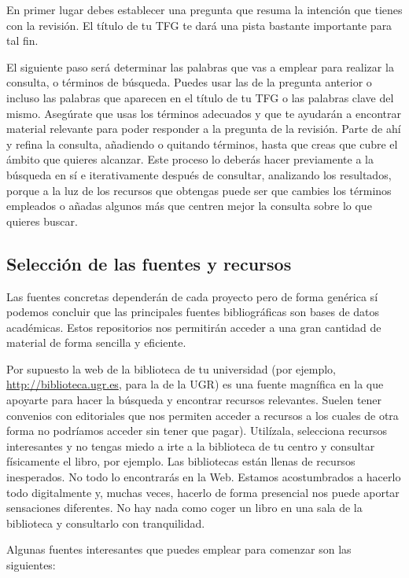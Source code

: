 En primer lugar debes establecer una pregunta que resuma la intención que tienes con la revisión. El título de tu TFG te dará una pista bastante importante para tal fin. 

El siguiente paso será determinar las palabras que vas a emplear para realizar la consulta, o términos de búsqueda. Puedes usar las de la pregunta anterior o incluso las palabras que aparecen en el título de tu TFG o las palabras clave del mismo. Asegúrate que usas los términos adecuados y que te ayudarán a encontrar material relevante para poder responder a la pregunta de la revisión. Parte de ahí y refina la consulta, añadiendo o quitando términos, hasta que creas que cubre el ámbito que quieres alcanzar. Este proceso lo deberás hacer previamente a la búsqueda en sí e iterativamente después de consultar, analizando los resultados, porque a la luz de los recursos que obtengas puede ser que cambies los términos empleados o añadas algunos más que centren mejor la consulta sobre lo que quieres buscar.

\subsection{Selección de las fuentes y recursos}

Las fuentes concretas dependerán de cada proyecto pero de forma genérica sí podemos concluir que las principales fuentes bibliográficas son bases de datos académicas. Estos repositorios nos permitirán acceder a una gran cantidad de material de forma sencilla y eficiente. 

Por supuesto la web de la biblioteca de tu universidad (por ejemplo, \url{http://biblioteca.ugr.es}, para la de la UGR) es una fuente magnífica en la que apoyarte para hacer la búsqueda y encontrar recursos relevantes. Suelen tener convenios con editoriales que nos permiten acceder a recursos a los cuales de otra forma no podríamos acceder sin tener que pagar). Utilízala, selecciona recursos interesantes y no tengas miedo a irte a la biblioteca de tu centro y consultar físicamente el libro, por ejemplo. Las bibliotecas están llenas de recursos inesperados. No todo lo encontrarás en la Web. Estamos acostumbrados a hacerlo todo digitalmente y, muchas veces, hacerlo de forma presencial nos puede aportar sensaciones diferentes. No hay nada como coger un libro en una sala de la biblioteca y consultarlo con tranquilidad. 

Algunas fuentes interesantes que puedes emplear para comenzar son las siguientes:

